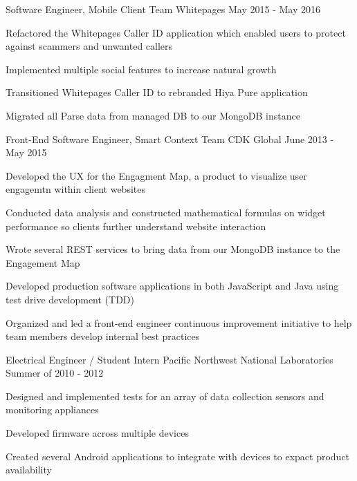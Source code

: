 \begin{cventries}
  \cventry
    {Software Engineer, Mobile Client Team} %
    {Whitepages} %
    {} %
    {May 2015 - May 2016} %
    {
	\begin{cvitems} %
    \item Refactored the Whitepages Caller ID application which enabled users to protect against scammers and unwanted callers
    \item Implemented multiple social features to increase natural growth
    \item Transitioned Whitepages Caller ID to rebranded Hiya Pure application
    \item Migrated all Parse data from managed DB to our MongoDB instance
	\end{cvitems}
    }

  \cventry
    {Front-End Software Engineer, Smart Context Team} %
    {CDK Global} %
    {} %
    {June 2013 - May 2015} %
    {
	\begin{cvitems} %
    \item Developed the UX for the Engagment Map, a product to visualize user engagemtn within client websites
    \item Conducted data analysis and constructed mathematical formulas on widget performance so clients further understand website interaction
    \item Wrote several REST services to bring data from our MongoDB instance to the Engagement Map
    \item Developed production software applications in both JavaScript and Java using test drive development (TDD)
    \item Organized and led a front-end engineer continuous improvement initiative to help team members develop internal best practices
	\end{cvitems}
    }
    
  \cventry
    {Electrical Engineer / Student Intern} %
    {Pacific Northwest National Laboratories} %
    {} %
    {Summer of 2010 - 2012} %
    {
	\begin{cvitems} %
    \item Designed and implemented tests for an array of data collection sensors and monitoring appliances
    \item Developed firmware across multiple devices
    \item Created several Android applications to integrate with devices to expact product availability
	\end{cvitems}
    }


\end{cventries}
